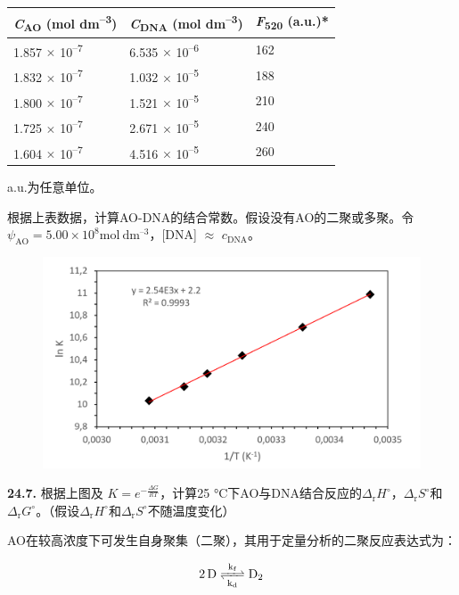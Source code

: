 \begin{longtable}[]{@{}lll@{}}
    \toprule
    \emph{C}\textsubscript{AO} (mol dm\textsuperscript{--3}) &
    \emph{C}\textsubscript{DNA} (mol dm\textsuperscript{--3}) &
    \emph{F}\textsubscript{520} (a.u.)*\tabularnewline
    \midrule
    \endhead
    1.857 \(\times\) 10\textsuperscript{--7} & 6.535 \(\times\) 10\textsuperscript{--6} &
    162\tabularnewline
    1.832 \(\times\) 10\textsuperscript{--7} & 1.032 \(\times\) 10\textsuperscript{--5} &
    188\tabularnewline
    1.800 \(\times\) 10\textsuperscript{--7} & 1.521 \(\times\) 10\textsuperscript{--5} &
    210\tabularnewline
    1.725 \(\times\) 10\textsuperscript{--7} & 2.671 \(\times\) 10\textsuperscript{--5} &
    240\tabularnewline
    1.604 \(\times\) 10\textsuperscript{--7} & 4.516 \(\times\) 10\textsuperscript{--5} &
    260\tabularnewline
    \bottomrule
\end{longtable}
\noindent *a.u.为任意单位。

\noindent 根据上表数据，计算AO-DNA的结合常数。假设没有AO的二聚或多聚。令$\psi_\mathrm{AO} = \mathrm{5.00 \times 10^8 mol\ dm^{–3}}$，[DNA] \(\approx\) $c_\mathrm{DNA}$。

\begin{figure}[h]
	\centering
	\includegraphics[width=14cm]{./pic/t24-1.png}
\end{figure}

\noindent\textbf{24.7.}
根据上图及 $K=e^{-\frac{\Delta  G}{RT}}$，计算25 °C下AO与DNA结合反应的$\Delta\mathrm{  _r}H^\circ$，$\Delta \mathrm{  _r}S^\circ$和$\Delta \mathrm{  _r}G^\circ$。（假设$\Delta \mathrm{  _r}H^\circ$和$\Delta \mathrm{  _r}S^\circ$不随温度变化）

AO在较高浓度下可发生自身聚集（二聚），其用于定量分析的二聚反应表达式为：

\[\ce{2D <=>[{k_\mathrm{f}}][{k_\mathrm{d}}] D_2 }\]

